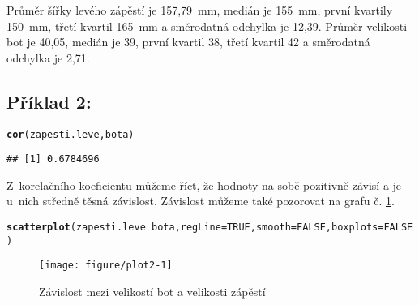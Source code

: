 \documentclass[twoside]{article}\usepackage[]{graphicx}\usepackage[]{color}
\makeatletter
\def\maxwidth{ %
  \ifdim\Gin@nat@width>\linewidth
    \linewidth
  \else
    \Gin@nat@width
  \fi
}
\newcommand{\hlnum}[1]{\textcolor[rgb]{0.686,0.059,0.569}{#1}}%
\newcommand{\hlopt}[1]{\textcolor[rgb]{0,0,0}{#1}}%
\newcommand{\hlstd}[1]{\textcolor[rgb]{0.345,0.345,0.345}{#1}}%
\newcommand{\hlkwc}[1]{\textcolor[rgb]{0.333,0.667,0.333}{#1}}%
\newcommand{\hlkwd}[1]{\textcolor[rgb]{0.737,0.353,0.396}{\textbf{#1}}}%
\newenvironment{kframe}{%
 \def\at@end@of@kframe{}%
 \ifinner\ifhmode%
  \def\at@end@of@kframe{\end{minipage}}%
  \begin{minipage}{\columnwidth}%
 \fi\fi%
 \def\FrameCommand##1{\hskip\@totalleftmargin \hskip-\fboxsep
 \colorbox{shadecolor}{##1}\hskip-\fboxsep
     \hskip-\linewidth \hskip-\@totalleftmargin \hskip\columnwidth}%
 \MakeFramed {\advance\hsize-\width
   \@totalleftmargin\z@ \linewidth\hsize
   \@setminipage}}%
 {\par\unskip\endMakeFramed%
 \at@end@of@kframe}
\newenvironment{knitrout}{}{} %
\makeatother
\begin{document}
Průměr šířky levého zápěstí je 157,79~\si{\milli\metre}, medián je 155~\si{\milli\metre}, první kvartily 150~\si{\milli\metre}, třetí kvartil 165~\si{\milli\metre} a směrodatná odchylka je 12,39. Průměr velikosti bot je 40,05, medián je 39, první kvartil 38, třetí kvartil 42 a směrodatná odchylka je 2,71.

\subsection*{Příklad 2:}
\begin{knitrout}
\color{fgcolor}\begin{kframe}
\begin{alltt}
\hlkwd{cor}\hlstd{(zapesti.leve, bota)}
\end{alltt}
\begin{verbatim}
## [1] 0.6784696
\end{verbatim}
\end{kframe}
\end{knitrout}

Z~korelačního koeficientu můžeme říct, že hodnoty na sobě pozitivně závisí a je u~nich středně těsná závislost. Závislost můžeme také pozorovat na grafu č. \ref{fig:plot2}.
\begin{knitrout}
\color{fgcolor}\begin{kframe}
\begin{alltt}
\hlkwd{scatterplot}\hlstd{(zapesti.leve}\hlopt{~}\hlstd{bota,} \hlkwc{regLine}\hlstd{=}\hlnum{TRUE}\hlstd{,} \hlkwc{smooth}\hlstd{=}\hlnum{FALSE}\hlstd{,} \hlkwc{boxplots}\hlstd{=}\hlnum{FALSE}\hlstd{)}
\end{alltt}
\end{kframe}\begin{figure}[h]
\texttt{[image: figure/plot2-1]} \caption[Závislost mezi velikostí bot a velikosti zápěstí]{Závislost mezi velikostí bot a velikosti zápěstí}\label{fig:plot2}
\end{figure}


\end{knitrout}


\newpage
\end{document}
